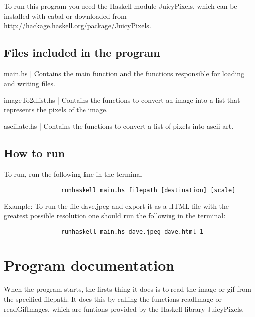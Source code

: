 \documentclass[12pt, a4paper]{article}
\begin{document}
	To run this program you need the Haskell module JuicyPixels, which can be installed with cabal or downloaded from \url{http://hackage.haskell.org/package/JuicyPixels}.



		\subsection{Files included in the program }

		main.hs | Contains the main function and the functions responsible for loading and writing files.

		imageTo2dlist.hs | Contains the functions to convert an image into a list that represents the pixels of the image.

		asciilate.hs | Contains the functions to convert a list of pixels into ascii-art.

		\subsection{How to run}

		To run, run the following line in the terminal
		\begin{footnotesize}
			\begin{verbatim}
				runhaskell main.hs filepath [destination] [scale]
			\end{verbatim}
		\end{footnotesize}

		Example: To run the file dave.jpeg and export it as a HTML-file with the greatest possible resolution one should run the following in the terminal:

		\begin{footnotesize}
			\begin{verbatim}
				runhaskell main.hs dave.jpeg dave.html 1
			\end{verbatim}
		\end{footnotesize}

	\section{Program documentation}

	When the program starts, the firsts thing it does is to read the image or gif from the specified filepath. It does this by calling the functions readImage or readGifImages, which are funtions provided by the Haskell library JuicyPixels.
\end{document}
